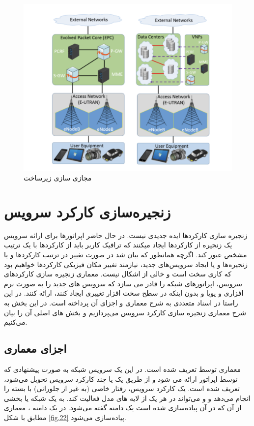 \begin{figure}[h!]
\center\includegraphics[scale=.5]{images/lte}
\caption{مجازی سازی زیرساخت }
\label{fig.21}
\end{figure}

\section{زنجیره‌سازی کارکرد سرویس}

زنجیره سازی کارکردها ایده جدیدی نیست.
در حال حاضر اپراتورها برای ارائه سرویس یک زنجیره از کارکردها ایجاد میکنند که ترافیک کاربر باید از کارکردها با یک ترتیب مشخص عبور کند.
اگرچه همانطور که بیان شد در صورت تغییر در ترتیب کارکردها و یا زنجیره‌ها و یا ایجاد سرویس‌های جدید، نیازمند تغییر مکان فیزیکی کارکردها خواهیم بود
که کاری سخت است و خالی از اشکال نیست.
معماری زنجیره سازی کارکردهای سرویس، اپراتورهای شبکه را قادر می سازد که سرویس های جدید را به صورت نرم افزاری و پویا و بدون اینکه در سطح سخت افزار تغییری ایجاد کنند، ارائه کنند.
در این راستا  در اسناد متعددی به شرح معماری و اجزای آن پرداخته است.
در این بخش به شرح معماری زنجیره سازی کارکرد سرویس می‌پردازیم و بخش های اصلی آن را بیان می‌کنیم.

\subsection{اجزای معماری }

معماری  توسط  تعریف شده است.
در این  یک سرویس شبکه به صورت پیشنهادی که توسط اپراتور ارائه می شود و
از طریق یک یا چند کارکرد سرویس تحویل می‌شود،
تعریف شده است.
یک کارکرد سرویس، رفتار خاصی (به غیر از جلورانی) با بسته را انجام می‌دهد و
و می‌تواند در هر یک از لایه های مدل  فعالیت کند.
به یک شبکه یا بخشی از آن که در آن   پیاده‌سازی شده است یک دامنه  گفته می‌شود.
در یک دامنه ، معماری  مطابق با شکل \ref{fig.22} پیاده‌سازی می‌شود.

